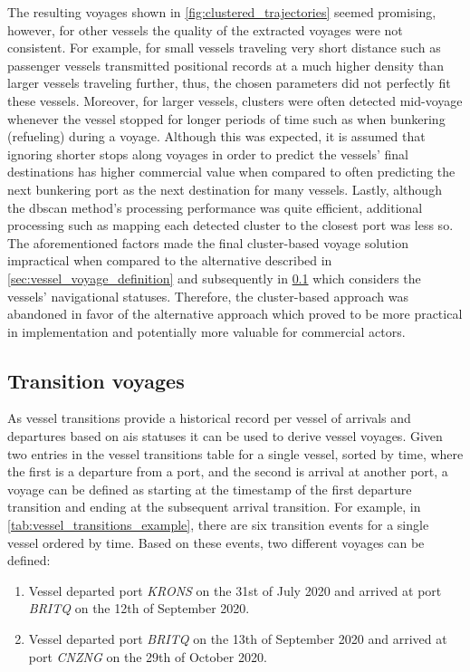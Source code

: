 The resulting voyages shown in \cref{fig:clustered_trajectories} seemed promising, however, for other vessels the quality of the extracted voyages were not consistent. For example, for small vessels traveling very short distance such as passenger vessels transmitted positional records at a much higher density than larger vessels traveling further, thus, the chosen parameters did not perfectly fit these vessels. Moreover, for larger vessels, clusters were often detected mid-voyage whenever the vessel stopped for longer periods of time such as when bunkering (refueling) during a voyage. Although this was expected, it is assumed that ignoring shorter stops along voyages in order to predict the vessels' final destinations has higher commercial value when compared to often predicting the next bunkering port as the next destination for many vessels. Lastly, although the \acrshort{dbscan} method's processing performance was quite efficient, additional processing such as mapping each detected cluster to the closest port was less so. The aforementioned factors made the final cluster-based voyage solution impractical when compared to the alternative described in \cref{sec:vessel_voyage_definition} and subsequently in \cref{sec:transition_voyages} which considers the vessels' navigational statuses. Therefore, the cluster-based approach was abandoned in favor of the alternative approach which proved to be more practical in implementation and potentially more valuable for commercial actors.

\subsection{Transition voyages}
\label{sec:transition_voyages}

As vessel transitions provide a historical record per vessel of arrivals and departures based on \acrshort{ais} statuses it can be used to derive vessel voyages. Given two entries in the vessel transitions table for a single vessel, sorted by time, where the first is a departure from a port, and the second is arrival at another port, a voyage can be defined as starting at the timestamp of the first departure transition and ending at the subsequent arrival transition. For example, in \cref{tab:vessel_transitions_example}, there are six transition events for a single vessel ordered by time. Based on these events, two different voyages can be defined:

\begin{enumerate}
    \item  Vessel departed port \textit{KRONS} on the 31st of July 2020 and arrived at port \textit{BRITQ} on the 12th of September 2020.
    \item  Vessel departed port \textit{BRITQ} on the 13th of September 2020 and arrived at port \textit{CNZNG} on the 29th of October 2020.
\end{enumerate}

